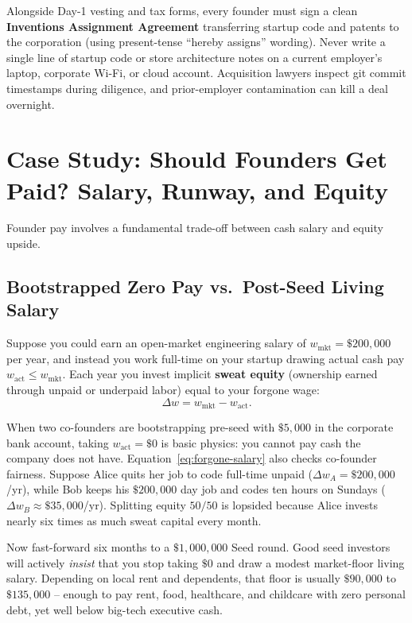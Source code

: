 \label{subsec:ip-assignment}
Alongside Day-1 vesting and tax forms, every founder must sign a clean \textbf{Inventions Assignment Agreement} transferring startup code and patents to the corporation (using present-tense ``hereby assigns'' wording). Never write a single line of startup code or store architecture notes on a current employer's laptop, corporate Wi-Fi, or cloud account. Acquisition lawyers inspect git commit timestamps during diligence, and prior-employer contamination can kill a deal overnight.

\section{Case Study: Should Founders Get Paid? Salary, Runway, and Equity}
\label{sec:founder-salary-vs-equity}

Founder pay involves a fundamental trade-off between cash salary and equity upside.

\subsection{Bootstrapped Zero Pay vs.\ Post-Seed Living Salary}
\label{subsec:sweat-capital}
\label{subsec:unpaid-vs-paid-stages}

Suppose you could earn an open-market engineering salary of $w_{\text{mkt}} = \$200{,}000$ per year, and instead you work full-time on your startup drawing actual cash pay $w_{\text{act}} \le w_{\text{mkt}}$. Each year you invest implicit \textbf{sweat equity} (ownership earned through unpaid or underpaid labor) equal to your forgone wage:
\begin{equation}\label{eq:forgone-salary}
  \Delta w = w_{\text{mkt}} - w_{\text{act}}.
\end{equation}

When two co-founders are bootstrapping pre-seed with $\$5{,}000$ in the corporate bank account, taking $w_{\text{act}} = \$0$ is basic physics: you cannot pay cash the company does not have. Equation~\eqref{eq:forgone-salary} also checks co-founder fairness. Suppose Alice quits her job to code full-time unpaid ($\Delta w_A = \$200{,}000$/yr), while Bob keeps his $\$200{,}000$ day job and codes ten hours on Sundays ($\Delta w_B \approx \$35{,}000$/yr). Splitting equity $50 / 50$ is lopsided because Alice invests nearly six times as much sweat capital every month.

Now fast-forward six months to a $\$1{,}000{,}000$ Seed round. Good seed investors will actively \emph{insist} that you stop taking $\$0$ and draw a modest market-floor living salary. Depending on local rent and dependents, that floor is usually $\$90{,}000$ to $\$135{,}000$ -- enough to pay rent, food, healthcare, and childcare with zero personal debt, yet well below big-tech executive cash.

